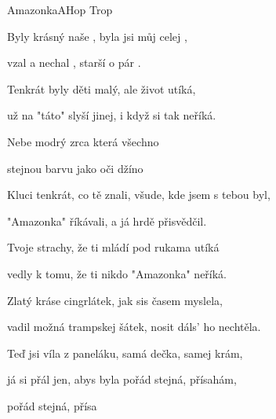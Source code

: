 \begin{song}{Amazonka}{A}{Hop Trop}

\begin{SBVerse}

Byly krásný naše , byla jsi můj celej , 

 vzal a nechal , starší  o pár .

\end{SBVerse}

\begin{SBVerse}

Tenkrát byly děti malý, ale život utíká,

už na "táto" slyší jinej, i když si tak neříká.

\end{SBVerse}

\begin{SBChorus}

Nebe modrý zrca  která všechno 

stejnou barvu jako   oči džíno

\end{SBChorus}

\begin{SBVerse}

Kluci tenkrát, co tě znali, všude, kde jsem s tebou byl,

"Amazonka" říkávali, a já hrdě přisvědčil.

\end{SBVerse}

\begin{SBVerse}

Tvoje strachy, že ti mládí pod rukama utíká

vedly k tomu, že ti nikdo "Amazonka" neříká.

\end{SBVerse}

\begin{SBChorus}

\end{SBChorus}

\begin{SBVerse}

Zlatý kráse cingrlátek, jak sis časem myslela,

vadil možná trampskej šátek, nosit dáls' ho nechtěla.

\end{SBVerse}

\begin{SBChorus}

Teď jsi víla z paneláku, samá dečka, samej krám,

já si přál jen, abys byla pořád stejná, přísahám,

pořád stejná, přísa

\end{SBChorus}

\end{song}

\clearpage
